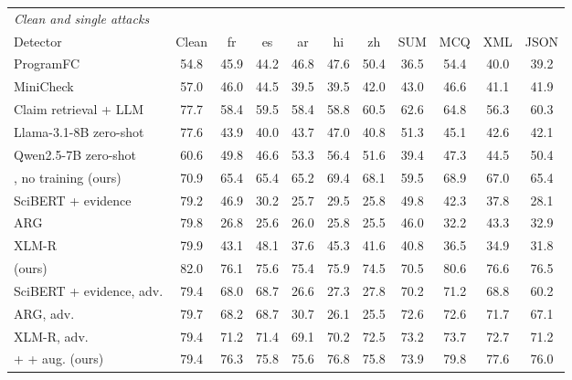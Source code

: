 \begin{table}[t]\centering\small\setlength{\tabcolsep}{4.5pt}
\begin{adjustbox}{max width=\textwidth}\begin{tabular}{lcccccccccc}
\toprule
\multicolumn{11}{l}{\emph{Clean and single attacks}} \\
Detector & Clean & fr & es & ar & hi & zh & SUM & MCQ & XML & JSON \\
\midrule
ProgramFC \citep{pan2023programfc} & 54.8 & 45.9 & 44.2 & 46.8 & 47.6 & 50.4 & 36.5 & 54.4 & 40.0 & 39.2 \\
MiniCheck \citep{tang2024minicheck} & 57.0 & 46.0 & 44.5 & 39.5 & 39.5 & 42.0 & 43.0 & 46.6 & 41.1 & 41.9 \\
Claim retrieval + LLM \citep{pikuliak2023multiclaim} & 77.7 & 58.4 & 59.5 & 58.4 & 58.8 & 60.5 & 62.6 & 64.8 & 56.3 & 60.3 \\
Llama-3.1-8B zero-shot \citep{grattafiori2024llama3} & 77.6 & 43.9 & 40.0 & 43.7 & 47.0 & 40.8 & 51.3 & 45.1 & 42.6 & 42.1 \\
Qwen2.5-7B zero-shot \citep{qwen2024qwen25} & 60.6 & 49.8 & 46.6 & 53.3 & 56.4 & 51.6 & 39.4 & 47.3 & 44.5 & 50.4 \\
\method{}, no training (ours) & 70.9 & 65.4 & 65.4 & 65.2 & 69.4 & 68.1 & 59.5 & 68.9 & 67.0 & 65.4 \\
SciBERT + evidence \citep{kotonya2020pubhealth} & 79.2 & 46.9 & 30.2 & 25.7 & 29.5 & 25.8 & 49.8 & 42.3 & 37.8 & 28.1 \\
ARG \citep{hu2024arg} & 79.8 & 26.8 & 25.6 & 26.0 & 25.8 & 25.5 & 46.0 & 32.2 & 43.3 & 32.9 \\
XLM-R \citep{conneau2020xlmr} & 79.9 & 43.1 & 48.1 & 37.6 & 45.3 & 41.6 & 40.8 & 36.5 & 34.9 & 31.8 \\
\method{} (ours) & 82.0 & 76.1 & 75.6 & 75.4 & 75.9 & 74.5 & 70.5 & 80.6 & 76.6 & 76.5 \\
\cmidrule(lr){1-11}
SciBERT + evidence, adv. \citep{kotonya2020pubhealth} & 79.4 & 68.0 & 68.7 & 26.6 & 27.3 & 27.8 & 70.2 & 71.2 & 68.8 & 60.2 \\
ARG, adv. \citep{hu2024arg} & 79.7 & 68.2 & 68.7 & 30.7 & 26.1 & 25.5 & 72.6 & 72.6 & 71.7 & 67.1 \\
XLM-R, adv. \citep{conneau2020xlmr} & 79.4 & 71.2 & 71.4 & 69.1 & 70.2 & 72.5 & 73.2 & 73.7 & 72.7 & 71.2 \\
\method{} + \air{} + aug. (ours) & 79.4 & 76.3 & 75.8 & 75.6 & 76.8 & 75.8 & 73.9 & 79.8 & 77.6 & 76.0 \\
\midrule

\end{tabular}
\end{adjustbox}
\end{table}
